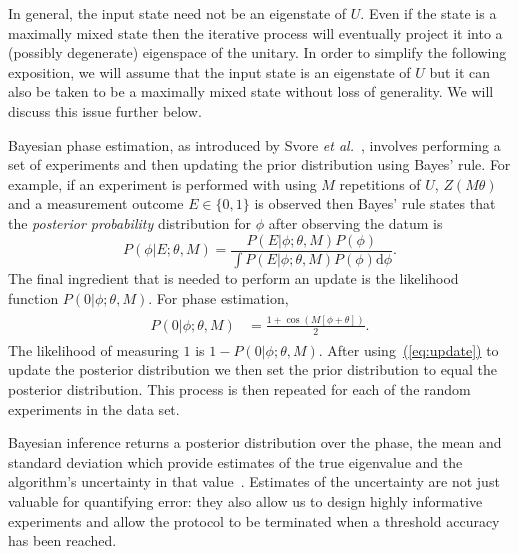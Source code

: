 \documentclass[aps,pra,amsmath,twocolumn,amssymb,superscriptaddress]{revtex4-1}
\newcommand{\eq}[1]{\hyperref[eq:#1]{(\ref*{eq:#1})}}
\newcommand{\etal}{\emph{et al.}}
\begin{document}
In general, the input state need not be an eigenstate of $U$.  Even if the state is a maximally mixed state then the iterative process will eventually project it into
a (possibly degenerate) eigenspace of the unitary.  In order to simplify the following exposition, we will assume that the input state is an eigenstate of $U$ but it can also be taken
to be a maximally mixed state without loss of generality.  We will discuss this issue further below.



Bayesian phase estimation, as introduced by Svore \etal~\cite{SHF14}, involves performing a 
set of experiments and then updating the prior distribution using Bayes' rule.
For example, if an experiment is performed with using $M$ repetitions of $U$,
$Z(M \theta)$ and a measurement outcome $E\in \{0,1\}$ is observed then Bayes'
rule states that the \emph{posterior probability} distribution for $\phi$
after observing the datum is
\begin{equation}
P(\phi|E;\theta,M) = \frac{P(E|\phi;\theta,M)P(\phi)}{\int P(E|\phi;\theta,M)P(\phi)\mathrm{d}{\phi}}.\label{eq:update}
\end{equation}
The final ingredient that is needed to perform an update is the likelihood
function $P(0|\phi;\theta,M)$. For phase estimation,
\begin{gather}
    \label{eq:likenodecohere}
    \begin{aligned}
        P(0|\phi;\theta,M) & = \frac{1+\cos(M[\phi +\theta])}{2}.
    \end{aligned}
\end{gather}
The likelihood of measuring $1$ is $1-P(0|\phi;\theta,M)$.
After using~\eq{update} to update the posterior distribution we then set the prior distribution to equal the posterior distribution.  This process is then repeated for each of the random experiments in the data set.

Bayesian inference returns a posterior
distribution over the phase, the mean and standard deviation which
provide estimates of the true eigenvalue and the algorithm's
uncertainty in that value~\cite{granade_robust_2012,ferrie_high_2014}. Estimates of
the uncertainty are not just valuable for quantifying error: they also allow us to design highly informative experiments 
 and allow the protocol to be terminated when a threshold accuracy has been reached.
\end{document}
